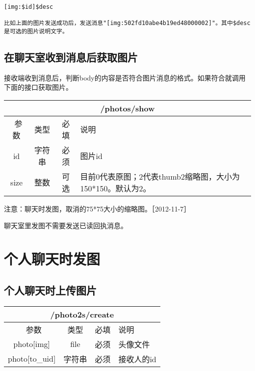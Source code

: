 \documentclass[cs4size]{ctexartutf8}
\begin{document}
\begin{verbatim}
[img:$id]$desc

比如上面的图片发送成功后，发送消息"[img:502fd10abe4b19ed48000002]"。其中$desc是可选的图片说明文字。
\end{verbatim}

\subsection{在聊天室收到消息后获取图片}

接收端收到消息后，判断body的内容是否符合图片消息的格式。如果符合就调用下面的接口获取图片。

\begin{table}[H]
   \begin{center}
\begin{tabular}{|c|c|c|p{12cm}|}
\hline
\multicolumn{4}{|c|}{/photos/show} \\
\hline\hline
 \  参数  & 类型 & 必填 &  说明  \\
  \hline
 id  & 字符串 & 必须 & 图片id\\
\hline
 size  & 整数 & 可选 &  目前0代表原图；2代表thumb2缩略图，大小为150*150。默认为2。\\ 
\hline
\end{tabular}
   \end{center}
\end{table}

注意：聊天时发图，取消的75*75大小的缩略图。［2012-11-7］

聊天室里发图不需要发送已读回执消息。




\section{个人聊天时发图}

\subsection{个人聊天时上传图片}

\begin{table}[H]
   \begin{center}
\begin{tabular}{|c|c|c|p{12cm}|}
\hline
\multicolumn{4}{|c|}{/photo2s/create} \\
\hline\hline
 \  参数  & 类型 & 必填 &  说明  \\
\hline
 photo[img]  & file & 必须 &  头像文件\\
 \hline
 photo[to\_uid]  & 字符串 & 必须 &  接收人的id\\
\hline
\end{tabular}
   \end{center}
\end{table}
\end{document}

